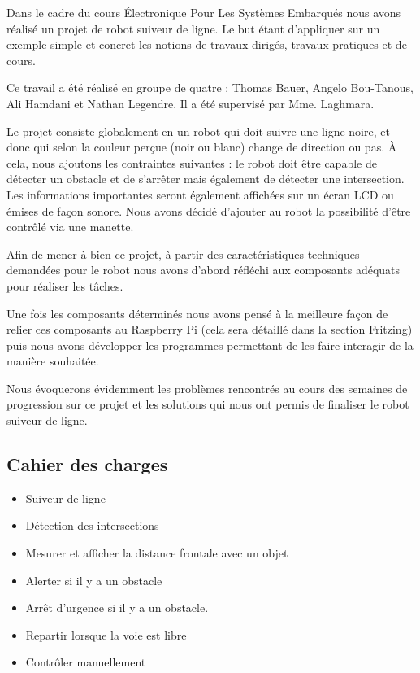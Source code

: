 Dans le cadre du cours Électronique Pour Les Systèmes Embarqués nous avons réalisé un projet de robot suiveur de ligne. Le but étant d'appliquer sur un exemple simple et concret les notions de travaux dirigés, travaux pratiques et de cours.

Ce travail a été réalisé en groupe de quatre : Thomas Bauer, Angelo Bou-Tanous, Ali Hamdani et Nathan Legendre. Il a été supervisé par Mme. Laghmara.

Le projet consiste globalement en un robot qui doit suivre une ligne noire, et donc qui selon la couleur perçue (noir ou blanc) change de direction ou pas. À cela, nous ajoutons les contraintes suivantes : le robot doit être capable de détecter un obstacle et de s'arrêter mais également de détecter une intersection. Les informations importantes seront également affichées sur un écran LCD ou émises de façon sonore. Nous avons décidé d'ajouter au robot la possibilité d'être contrôlé via une manette.

Afin de mener à bien ce projet, à partir des caractéristiques techniques demandées pour le robot nous avons d'abord réfléchi aux composants adéquats pour réaliser les tâches.

Une fois les composants déterminés nous avons pensé à la meilleure façon de relier ces composants au Raspberry Pi (cela sera détaillé dans la section Fritzing) puis nous avons développer les programmes permettant de les faire interagir de la manière souhaitée.

Nous évoquerons évidemment les problèmes rencontrés au cours des semaines de progression sur ce projet et les solutions qui nous ont permis de finaliser le robot suiveur de ligne.

\subsection*{Cahier des charges}
\begin{itemize}
    \item Suiveur de ligne
    \item Détection des intersections
    \item Mesurer et afficher la distance frontale avec un objet
    \item Alerter si il y a un obstacle
    \item Arrêt d'urgence si il y a un obstacle.
    \item Repartir lorsque la voie est libre
    \item Contrôler manuellement
\end{itemize}

\newpage